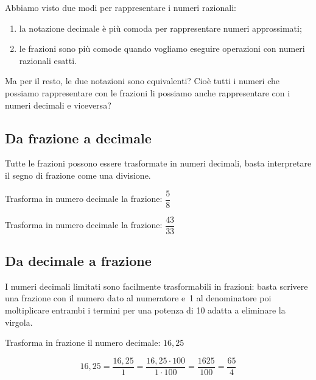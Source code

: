 Abbiamo visto due modi per rappresentare i numeri razionali:
\begin{enumerate}
 \item la notazione decimale è più comoda per rappresentare numeri 
approssimati;
 \item le frazioni sono più comode quando vogliamo eseguire operazioni con 
numeri razionali esatti.
\end{enumerate}

Ma per il resto, le due notazioni sono equivalenti? Cioè tutti i numeri che 
possiamo rappresentare con le frazioni li possiamo anche rappresentare con 
i numeri decimali e viceversa?

\subsection{Da frazione a decimale}

Tutte le frazioni possono essere trasformate in numeri decimali, basta 
interpretare il segno di frazione come una divisione.

\begin{esempio}
Trasforma in numero decimale la frazione: \(\dfrac{5}{8}\)
\begin{center}
 \begin{center}\end{center}
\end{center}
\end{esempio}

\begin{esempio}
Trasforma in numero decimale la frazione: \(\dfrac{43}{33}\)
\begin{center}
 \begin{center}\end{center}
\end{center}
\end{esempio}

\subsection{Da decimale a frazione}

I numeri decimali limitati sono facilmente trasformabili in frazioni: basta 
scrivere una frazione con il numero dato al numeratore e~1 al denominatore 
poi moltiplicare entrambi i termini per una potenza di 10 adatta a 
eliminare la virgola.

\begin{esempio}
Trasforma in frazione il numero decimale: \(16,25\)
\begin{center}
 \[16,25 = \frac{16,25}{1} = \frac{16,25 \cdot 100}{1 \cdot 100} =
   \frac{1625}{100} = \frac{65}{4}\]
\end{center}
\end{esempio}

